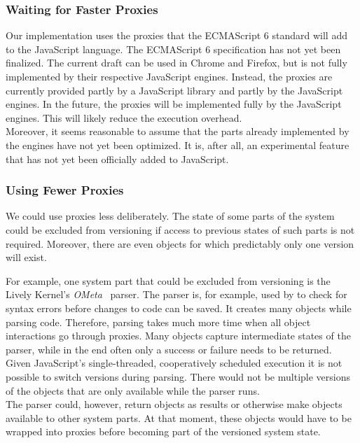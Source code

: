 \subsubsection{Waiting for Faster Proxies}

Our implementation uses the proxies that the ECMAScript 6 standard will add to the JavaScript language.
The ECMAScript 6 specification has not yet been finalized.
The current draft can be used in Chrome and Firefox, but is not fully implemented by their respective JavaScript engines.
Instead, the proxies are currently provided partly by a JavaScript library and partly by the JavaScript engines.
In the future, the proxies will be implemented fully by the JavaScript engines.
This will likely reduce the execution overhead.\\
Moreover, it seems reasonable to assume that the parts already implemented by the engines have not yet been optimized. 
It is, after all, an experimental feature that has not yet been officially added to JavaScript.

\subsubsection{Using Fewer Proxies}

We could use proxies less deliberately.
The state of some parts of the system could be excluded from versioning if access to previous states of such parts is not required.
Moreover, there are even objects for which predictably only one version will exist.

For example, one system part that could be excluded from versioning is the Lively Kernel's \emph{OMeta}~\cite{Warth2007OOL} parser.
The parser is, for example, used by to check for syntax errors before changes to code can be saved.
It creates many objects while parsing code.
Therefore, parsing takes much more time when all object interactions go through proxies.
Many objects capture intermediate states of the parser, while in the end often only a success or failure needs to be returned.
Given JavaScript's single-threaded, cooperatively scheduled execution it is not possible to switch versions during parsing.
There would not be multiple versions of the objects that are only available while the parser runs.\\
The parser could, however, return objects as results or otherwise make objects available to other system parts.
At that moment, these objects would have to be wrapped into proxies before becoming part of the versioned system state.

